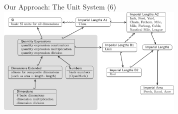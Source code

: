 \documentclass{beamer}
\begin{document}
  \begin{frame}{Our Approach: The Unit System (6)}
    \includegraphics[width=90mm]{imgs/graph1.png}
  \end{frame}
\end{document}
